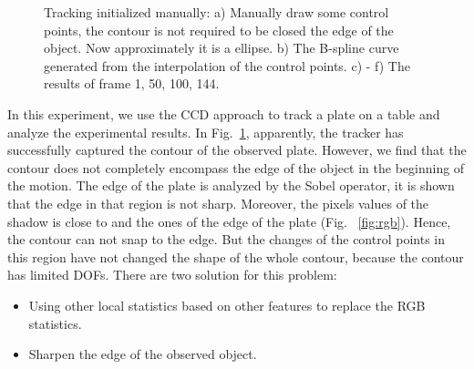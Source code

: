 \begin{figure}[htbp]
\begin{minipage}[t]{0.5\linewidth}
  \end{minipage} 
  \begin{minipage}[t]{0.5\linewidth} 
    \centering 
  \end{minipage} 
  \begin{minipage}[t]{0.5\linewidth} 
    \centering 
  \end{minipage} 
  \caption[Tracking initialized manually]{Tracking initialized
    manually: a) Manually draw some control points, the contour is not
    required to  be closed the edge of the object. Now approximately
    it is a ellipse. b) The B-spline
    curve generated from the interpolation of the control points. c) -
    f) The results of frame 1, 50, 100, 144.
  }
  \label{fig:plate}
\end{figure}
In this experiment, we use the CCD approach to track a plate on a
table and analyze the experimental results. 
In Fig.~\ref{fig:plate}, apparently, the tracker has successfully
captured the contour of the observed plate. However, we find that the
contour does not completely encompass the edge of the object in the
beginning of the motion. The edge of the plate is analyzed by the
Sobel operator, it is shown that the edge in that region is not
sharp. Moreover, the pixels values of the shadow is
close to and the ones of the edge of the plate (Fig. ~\ref{fig:rgb}). Hence,
the contour can not snap to the edge. But the changes of the control
points in this region have not changed the shape of the whole
contour, because the contour has limited DOFs. There are two solution
for this problem:
\begin{itemize}
\item Using other local statistics based on other features to replace
  the RGB statistics.
\item Sharpen the edge of the observed object.
\end{itemize}

